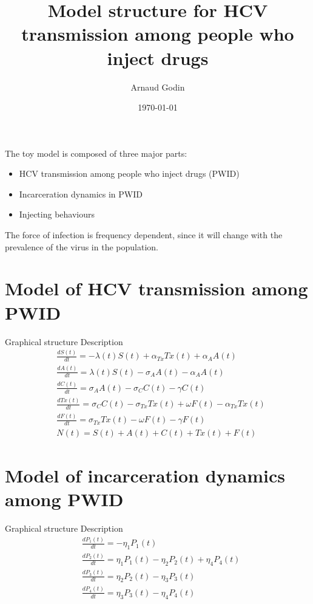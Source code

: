 \documentclass[11pt]{article}
\begin{document}
\title{Model structure for HCV transmission among people who inject drugs}
\author{Arnaud Godin}
\date{\today}
\maketitle

\noindent The toy model is composed of three major parts:
\begin{itemize}
	\item HCV transmission among people who inject drugs (PWID)
	\item Incarceration dynamics in PWID
	\item Injecting behaviours
\end{itemize}
 The force of infection is frequency dependent, since it will change with the prevalence of the virus in the population.

\section{\large{Model of HCV transmission among PWID}}
Graphical structure
Description
\begin{align*}
	& \frac{dS(t)}{dt} = -\lambda(t) S(t) + \alpha_{Tx} Tx(t) + \alpha_{A} A(t) \\
	& \frac{dA(t)}{dt} = \lambda(t) S(t) - \sigma_{A} A(t) - \alpha_{A} A(t) \\
	& \frac{dC(t)}{dt} = \sigma_{A} A(t) - \sigma_{C} C(t) - \gamma C(t) \\
	& \frac{dTx(t)}{dt} = \sigma_{C} C(t) - \sigma_{Tx} Tx(t) +
	\omega F(t) - \alpha_{Tx} Tx(t)\\
	& \frac{dF(t)}{dt} = \sigma_{Tx} Tx(t) - \omega F(t) - \gamma F(t) \\
	& N(t) = S(t) + A(t) + C(t) + Tx(t) + F(t) 
\end{align*}

\section{\large{Model of incarceration dynamics among PWID}}
Graphical structure
Description
\begin{align*}
	& \frac{dP_{1}(t)}{dt} = -\eta_{1} P_{1}(t) \\
	& \frac{dP_{2}(t)}{dt} = \eta_{1} P_{1}(t) - \eta_{2} P_{2}(t) + \eta_{4} P_{4}(t) \\
	& \frac{dP_{3} (t)}{dt} = \eta_{2} P_{2}(t) - \eta_{3} P_{3}(t) \\
	& \frac{dP_{4} (t)}{dt} = \eta_{3} P_{3}(t) - \eta_{4} P_{4}(t)
\end{align*}
\end{document}
